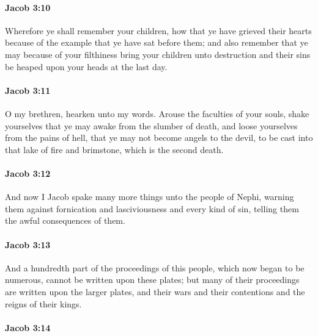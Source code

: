		\paragraph{Jacob 3:10} %
			\label{JACOB-3-10}

			Wherefore ye shall remember your children,
			how that ye have grieved their hearts
			because of the example that ye have sat before them;
			and also remember that ye may because of your filthiness
			bring your children unto destruction
			and their sins be heaped upon your heads at the last day.

		\paragraph{Jacob 3:11} %
			\label{JACOB-3-11}

			O my brethren, hearken unto my words.
			Arouse the faculties of your souls,
			shake yourselves that ye may awake from the slumber of death,
			and loose yourselves from the pains of hell,
			that ye may not become angels to the devil,
			to be cast into that lake of fire and brimstone, which is the second death.

		\paragraph{Jacob 3:12} %
			\label{JACOB-3-12}

			And now I Jacob spake many more things unto the people of Nephi,
			warning them against fornication and lasciviousness and every kind of sin,
			telling them the awful consequences of them.

		\paragraph{Jacob 3:13} %
			\label{JACOB-3-13}

			And a hundredth part of the proceedings of this people,
			which now began to be numerous,
			cannot be written upon these plates;
			but many of their proceedings are written upon the larger plates,
			and their wars and their contentions and the reigns of their kings.

		\paragraph{Jacob 3:14} %
			\label{JACOB-3-14}

